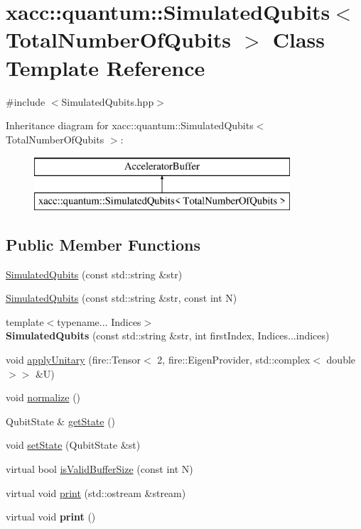\hypertarget{a00067}{}\section{xacc\+:\+:quantum\+:\+:Simulated\+Qubits$<$ Total\+Number\+Of\+Qubits $>$ Class Template Reference}
\label{a00067}


{\ttfamily \#include $<$Simulated\+Qubits.\+hpp$>$}

Inheritance diagram for xacc\+:\+:quantum\+:\+:Simulated\+Qubits$<$ Total\+Number\+Of\+Qubits $>$\+:\begin{figure}[H]
\begin{center}
\leavevmode
\includegraphics[height=2.000000cm]{a00067}
\end{center}
\end{figure}
\subsection*{Public Member Functions}
\begin{DoxyCompactItemize}
\item 
\hyperlink{a00067_afeb610fbd0c761caa15136e77260ba48}{Simulated\+Qubits} (const std\+::string \&str)
\item 
\hyperlink{a00067_a3d0f465d821565c582c37b6b4d7e4f79}{Simulated\+Qubits} (const std\+::string \&str, const int N)
\item 
{\footnotesize template$<$typename... Indices$>$ }\\{\bfseries Simulated\+Qubits} (const std\+::string \&str, int first\+Index, Indices...\+indices)\hypertarget{a00067_a9366eb77384fb1e9f34a693b9a7ea1b8}{}\label{a00067_a9366eb77384fb1e9f34a693b9a7ea1b8}

\item 
void \hyperlink{a00067_a97ecaaf5aab14bc017726fe9cfd41c46}{apply\+Unitary} (fire\+::\+Tensor$<$ 2, fire\+::\+Eigen\+Provider, std\+::complex$<$ double $>$$>$ \&U)
\item 
void \hyperlink{a00067_aea8a0358100e815a7c70eee7f8ba9d45}{normalize} ()
\item 
Qubit\+State \& \hyperlink{a00067_a75b8fde8e812931fe087cb078108c00d}{get\+State} ()
\item 
void \hyperlink{a00067_a2a0e202f943d3ec8d848c7e25062c6e1}{set\+State} (Qubit\+State \&st)
\item 
virtual bool \hyperlink{a00067_ac689b60b0218bf8d0c11ef2f151e7272}{is\+Valid\+Buffer\+Size} (const int N)
\item 
virtual void \hyperlink{a00067_ad9a39b44161fa0309167b9791ed10945}{print} (std\+::ostream \&stream)
\item 
virtual void {\bfseries print} ()\hypertarget{a00067_a7cda9427b5a0d3eaa9573eb9d992f51c}{}\label{a00067_a7cda9427b5a0d3eaa9573eb9d992f51c}

\end{DoxyCompactItemize}
